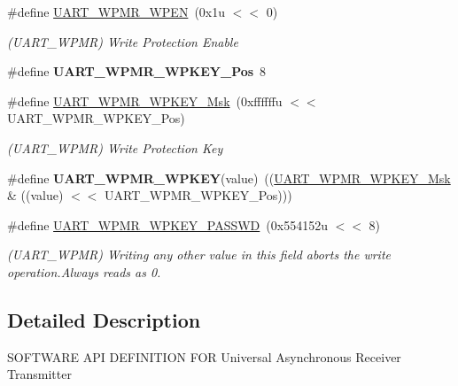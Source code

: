 \begin{DoxyCompactItemize}
\#define \mbox{\hyperlink{group__SAME70__UART_gab930e465c6acf9e610bd01ebb4bf6668}{U\+A\+R\+T\+\_\+\+W\+P\+M\+R\+\_\+\+W\+P\+EN}}~(0x1u $<$$<$ 0)
\begin{DoxyCompactList}\small\item\em (U\+A\+R\+T\+\_\+\+W\+P\+MR) Write Protection Enable \end{DoxyCompactList}\item 
\mbox{\label{group__SAME70__UART_ga1cbbb3d466864d74e7e13d946b832700}} 
\#define {\bfseries U\+A\+R\+T\+\_\+\+W\+P\+M\+R\+\_\+\+W\+P\+K\+E\+Y\+\_\+\+Pos}~8
\item 
\mbox{\label{group__SAME70__UART_ga4b752d7c7446393d83f3a3377ec85d5c}} 
\#define \mbox{\hyperlink{group__SAME70__UART_ga4b752d7c7446393d83f3a3377ec85d5c}{U\+A\+R\+T\+\_\+\+W\+P\+M\+R\+\_\+\+W\+P\+K\+E\+Y\+\_\+\+Msk}}~(0xffffffu $<$$<$ U\+A\+R\+T\+\_\+\+W\+P\+M\+R\+\_\+\+W\+P\+K\+E\+Y\+\_\+\+Pos)
\begin{DoxyCompactList}\small\item\em (U\+A\+R\+T\+\_\+\+W\+P\+MR) Write Protection Key \end{DoxyCompactList}\item 
\mbox{\label{group__SAME70__UART_ga4ce861fd8b265686f0bca931168fa1de}} 
\#define {\bfseries U\+A\+R\+T\+\_\+\+W\+P\+M\+R\+\_\+\+W\+P\+K\+EY}(value)~((\mbox{\hyperlink{group__SAMV71__UART_ga4b752d7c7446393d83f3a3377ec85d5c}{U\+A\+R\+T\+\_\+\+W\+P\+M\+R\+\_\+\+W\+P\+K\+E\+Y\+\_\+\+Msk}} \& ((value) $<$$<$ U\+A\+R\+T\+\_\+\+W\+P\+M\+R\+\_\+\+W\+P\+K\+E\+Y\+\_\+\+Pos)))
\item 
\mbox{\label{group__SAME70__UART_ga9f359612234f83812e577e2dfcf2b5ec}} 
\#define \mbox{\hyperlink{group__SAME70__UART_ga9f359612234f83812e577e2dfcf2b5ec}{U\+A\+R\+T\+\_\+\+W\+P\+M\+R\+\_\+\+W\+P\+K\+E\+Y\+\_\+\+P\+A\+S\+S\+WD}}~(0x554152u $<$$<$ 8)
\begin{DoxyCompactList}\small\item\em (U\+A\+R\+T\+\_\+\+W\+P\+MR) Writing any other value in this field aborts the write operation.\+Always reads as 0. \end{DoxyCompactList}\end{DoxyCompactItemize}


\subsection{Detailed Description}
S\+O\+F\+T\+W\+A\+RE A\+PI D\+E\+F\+I\+N\+I\+T\+I\+ON F\+OR Universal Asynchronous Receiver Transmitter 